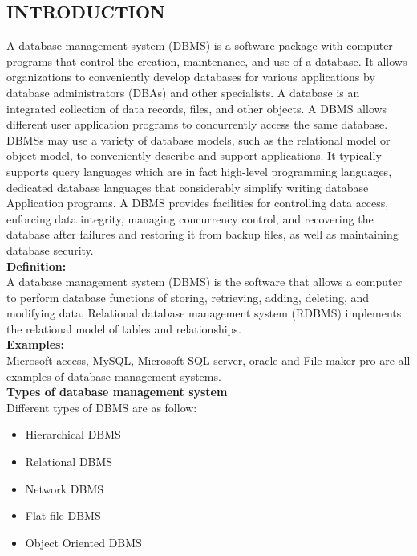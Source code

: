 \documentclass[12pt]{article} %
\begin{document}
\subsection{INTRODUCTION}
A database management system (DBMS) is a software package with computer programs that control the creation, maintenance, and use of a database. It allows organizations to conveniently develop databases for various applications by database administrators (DBAs) and other specialists. A database is an integrated collection of data records, files, and other objects. A DBMS allows different user application programs to concurrently access the same database. DBMSs may use a variety of database models, such as the relational model or object model, to conveniently describe and support applications. It typically supports query languages which are in fact high-level programming languages, dedicated database languages that considerably simplify writing database Application programs.  A DBMS provides facilities for controlling data access, enforcing data integrity, managing concurrency control, and recovering the database after failures and restoring it from backup files, as well as maintaining database security.
\\
\newline
 \textbf{Definition:}
\\A database management system (DBMS) is the software that allows a computer to perform database functions of storing, retrieving, adding, deleting, and modifying data. Relational database management system (RDBMS) implements the relational model of tables and relationships.
\\
\newline
 \textbf{Examples:}
\\Microsoft access, MySQL, Microsoft SQL server, oracle and File maker pro are all examples of database management systems.
\\
\newline
 \textbf{Types of database management system}
  \\Different types of DBMS are as follow:
 \begin{itemize}
\item	Hierarchical DBMS  
\item	Relational DBMS
\item	Network DBMS
\item	Flat file DBMS
\item	 Object Oriented DBMS        
\end{itemize}
\end{document}

